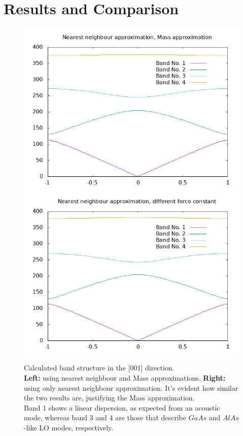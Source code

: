 \documentclass{article}
\begin{document}
\section*{Results and Comparison} 
\begin{figure}[ht]
	\centering
	\includegraphics[scale=0.3]{same.jpeg}
	\includegraphics[scale=0.3]{different.jpeg}
	\caption{Calculated band structure in the [001] direction.\\ \textbf{Left:} using nearest neighbour and Mass approximations. \textbf{Right:} using only nearest neighbour approximation. It's evident how similar the two results are, justifying the Mass approximation.\\
	Band 1 shows a linear dispersion, as expected from an acoustic mode, whereas band 3 and 4 are those that describe $GaAs$ and $AlAs$-like LO modes, respectively.}
	\label{fig:nearest}
\end{figure}
\end{document}
